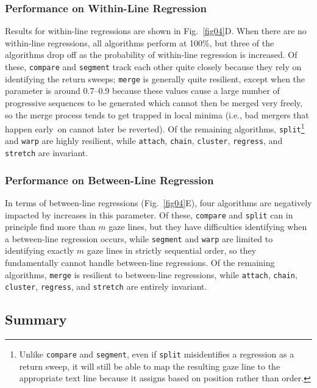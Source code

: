 \documentclass[doc,biblatex]{apa7}
\begin{document}
\subsubsection{Performance on Within-Line Regression}

Results for within-line regressions are shown in Fig.~\ref{fig04}D. When there are no within-line regressions, all algorithms perform at 100\%, but three of the algorithms drop off as the probability of within-line regression is increased. Of these, \texttt{compare} and \texttt{segment} track each other quite closely because they rely on identifying the return sweeps; \texttt{merge} is generally quite resilient, except when the parameter is around 0.7--0.9 because these values cause a large number of progressive sequences to be generated which cannot then be merged very freely, so the merge process tends to get trapped in local minima (i.e., bad mergers that happen early~on cannot later be reverted). Of the remaining algorithms, \texttt{split}\footnote{Unlike \texttt{compare} and \texttt{segment}, even if \texttt{split} misidentifies a regression as a return sweep, it will still be able to map the resulting gaze line to the appropriate text line because it assigns based on position rather than order.} and \texttt{warp} are highly resilient, while \texttt{attach}, \texttt{chain}, \texttt{cluster}, \texttt{regress}, and \texttt{stretch} are invariant.

\subsubsection{Performance on Between-Line Regression}

In terms of between-line regressions (Fig.~\ref{fig04}E), four algorithms are negatively impacted by increases in this parameter. Of these, \texttt{compare} and \texttt{split} can in principle find more than $m$ gaze lines, but they have difficulties identifying when a between-line regression occurs, while \texttt{segment} and \texttt{warp} are limited to identifying exactly $m$ gaze lines in strictly sequential order, so they fundamentally cannot handle between-line regressions. Of the remaining algorithms, \texttt{merge} is resilient to between-line regressions, while \texttt{attach}, \texttt{chain}, \texttt{cluster}, \texttt{regress}, and \texttt{stretch} are entirely invariant.

\subsection{Summary}
\end{document}
